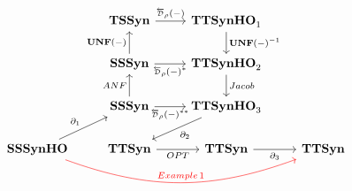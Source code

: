 

\[
\begin{tikzcd}
	& \TSSyn \ar[r,"{\Dsynrev[\rho]{-}}"] 
	& \TTSynHO_1 \ar[d,"\UNF{-}^{-1}"] &  \\
	& \SSSyn \ar[u,"\UNF{-}"]  \ar[r,"{\Dsynrev[\rho]{-}^*}"'] 
	& \TTSynHO_2 \ar[d,"Jacob"] \\
	& \SSSyn \ar[u,"ANF"] \ar[r,"{\Dsynrev[\rho]{-}^{**}}"'] 
	&  \TTSynHO_3 \ar[dl,"\partial_2"] \\
	\SSSynHO \ar[ur,"\partial_1"]  \ar[rrr,bend right=20,color=red,"Example\,1"]
	& \TTSyn \ar[r,"OPT"'] 
	& \TTSyn \ar[r,"\partial_3"']
	& \TTSyn 
\end{tikzcd}
\]

